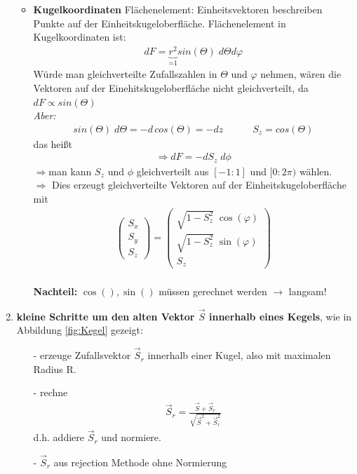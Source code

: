 \documentclass[12pt]{article}
\begin{document}
\begin{enumerate}
\begin{itemize}
			\item \textbf{Kugelkoordinaten} Flächenelement:
			Einheitsvektoren beschreiben Punkte auf der Einheitskugeloberfläche. Flächenelement in Kugelkoordinaten ist:
			\begin{align}
			dF= \underbrace{r^2}_\text{=1} sin(\Theta) \; d \Theta d\varphi
			\end{align}	
			Würde man gleichverteilte Zufallszahlen in $\Theta$ und $\varphi$ nehmen, wären die Vektoren auf der Einehitskugeloberfläche nicht gleichverteilt, da $dF \propto sin(\Theta)$ \\
			\textit{Aber:} 
			\begin{align*}
			sin(\Theta) \; d\Theta = - d \, cos(\Theta) = -dz \quad \quad \quad S_z =cos(\Theta)
			\end{align*}
			das heißt 
			\begin{align*}
			\Rightarrow dF= - d S_z \; d \phi 
			\end{align*}
			$ \Rightarrow$man kann $S_z$ und $\phi$ gleichverteilt aus $[-1:1]$ und $[0:2\pi)$ wählen. \\
			$\Rightarrow$ Dies erzeugt gleichverteilte Vektoren auf der Einheitskugeloberfläche mit
\begin{align*}
 \begin{pmatrix} S_x \\ S_y \\ S_z \end{pmatrix} =  \begin{pmatrix} \sqrt{1-S_z^2} \; \cos(\varphi) \\ \sqrt{1-S_z^2} \; \sin(\varphi) \\ S_z \end{pmatrix}
\end{align*}
			\\ 
\textbf{Nachteil:} $\cos(),\sin()$ müssen gerechnet werden $\to$ langsam!			
\end{itemize}
			
			
			\item \textbf{ kleine Schritte um den alten Vektor $\vec{S}$ innerhalb eines Kegels}, wie in Abbildung \ref{fig:Kegel} gezeigt:
			\begin{itemize}
			\item[-] erzeuge Zufallsvektor $\vec{S}_r$ innerhalb einer Kugel, also mit maximalen Radius R.
			\item[-] rechne 
			\begin{align}
			\vec{S}_r = \frac{\vec{S} + \vec{S}_r}{\sqrt{\vec{S}^2 + \vec{S}_r^2}}
			\end{align} d.h. addiere $\vec{S}_r$ und normiere.
			\item[-] $\vec{S}_r$ aus rejection Methode ohne Normierung
			\end{itemize}
			

\end{enumerate}
\end{document}
